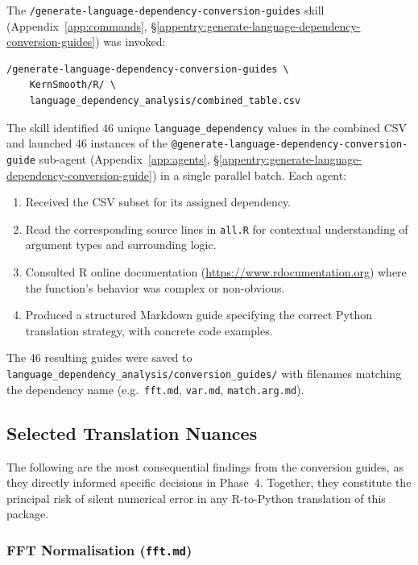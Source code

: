 \documentclass[12pt,a4paper]{article}
\begin{document}
The \texttt{/generate-language-dependency-conversion-guides} skill (Appendix~\ref{app:commands}, \S\ref{appentry:generate-language-dependency-conversion-guides}) was invoked:

\begin{lstlisting}[style=shell]
/generate-language-dependency-conversion-guides \
    KernSmooth/R/ \
    language_dependency_analysis/combined_table.csv
\end{lstlisting}

The skill identified 46 unique \texttt{language\_dependency} values in the combined CSV and launched 46 instances of the \texttt{@generate-language-dependency-conversion-guide} sub-agent (Appendix~\ref{app:agents}, \S\ref{appentry:generate-language-dependency-conversion-guide}) in a single parallel batch. Each agent:
\begin{enumerate}
  \item Received the CSV subset for its assigned dependency.
  \item Read the corresponding source lines in \texttt{all.R} for contextual understanding of argument types and surrounding logic.
  \item Consulted R online documentation (\url{https://www.rdocumentation.org}) where the function's behavior was complex or non-obvious.
  \item Produced a structured Markdown guide specifying the correct Python translation strategy, with concrete code examples.
\end{enumerate}

The 46 resulting guides were saved to \texttt{language\_dependency\_analysis/conversion\_guides/} with filenames matching the dependency name (e.g.\ \texttt{fft.md}, \texttt{var.md}, \texttt{match.arg.md}).

\subsection{Selected Translation Nuances}

The following are the most consequential findings from the conversion guides, as they directly informed specific decisions in Phase~4. Together, they constitute the principal risk of silent numerical error in any R-to-Python translation of this package.

\subsubsection{FFT Normalisation (\texttt{fft.md})}
\end{document}
